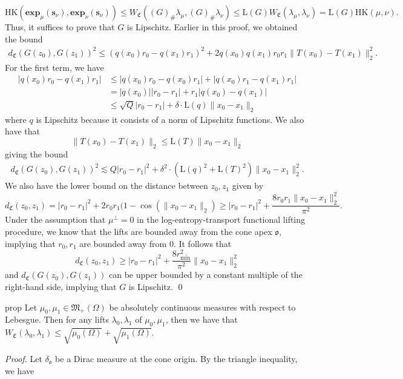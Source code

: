 \documentclass[11pt]{article}
\begin{document}
\[\text{HK}(\mathbf{exp}_\mu(\mathbf{s}_\nu), \mathbf{exp}_\nu(\mathbf{s}_\nu)) \leq W_\mathfrak{C}((G)_\# \lambda_{\mu}, (G)_\#\lambda_\nu) \leq \text{L}(G)W_\mathfrak{C}(\lambda_\mu, \lambda_\nu) = \text{L}(G)\text{HK}(\mu, \nu).\]
Thus, it suffices to prove that $G$ is Lipschitz. Earlier in this proof, we obtained the bound
\begin{align*}
    d_\mathfrak{C}(G(z_0), G(z_1))^2 \leq (q(x_0)r_0 - q(x_1)r_1)^2 + 2q(x_0)q(x_1)r_0r_1\|T(x_0) - T(x_1)\|_2^2.
\end{align*}
For the first term, we have
\begin{align*}
    |q(x_0)r_0 - q(x_1)r_1| &\leq |q(x_0)r_0 - q(x_0)r_1| + |q(x_0)r_1 - q(x_1)r_1| \\
    &= |q(x_0)||r_0 - r_1| + r_1|q(x_0) - q(x_1)| \\
    &\leq \sqrt{Q}|r_0 - r_1| + \delta\cdot \text{L}(q)\|x_0 - x_1\|_2
\end{align*}
where $q$ is Lipschitz because it consists of a norm of Lipschitz functions. We also have that 
\[\|T(x_0) - T(x_1)\|_2 \le \text{L}(T)\|x_0 - x_1\|_2\]
giving the bound
\begin{align*}
    d_\mathfrak{C}(G(z_0), G(z_1))^2 \lesssim Q|r_0 - r_1|^2 + \delta^2\cdot (\text{L}(q)^2 + \text{L}(T)^2)\|x_0 - x_1\|_2^2.
\end{align*}
We also have the lower bound on the distance between $z_0, z_1$ given by
\[d_\mathfrak{C}(z_0, z_1) = |r_0 - r_1|^2 + 2r_0r_1(1 - \cos(\|x_0 - x_1\|_2) \geq |r_0 - r_1|^2 + \frac{8r_0r_1\|x_0 - x_1\|_2^2}{\pi^2}.\]
Under the assumption that $\mu^\perp = 0$ in the log-entropy-transport functional lifting procedure, we know that the lifts are bounded away from the cone apex $\mathfrak{o},$ implying that $r_0, r_1$ are bounded away from 0. It follows that 
\[d_\mathfrak{C}(z_0, z_1)\geq |r_0 - r_1|^2 + \frac{8r_{\min}^2}{\pi^2}\|x_0 - x_1\|_2^2\]
and $d_\mathfrak{C}(G(z_0), G(z_1))$ can be upper bounded by a constant multiple of the right-hand side, implying that $G$ is Lipschitz. 
\qed{}
\\
\begin{restatable}{prop}{} \label{cone wasserstein upper bound}
    Let $\mu_0, \mu_1 \in \mathfrak{M}_+(\Omega)$ be absolutely continuous measures with respect to Lebesgue. Then for any lifts $\lambda_0, \lambda_1$ of $\mu_0, \mu_1$, then we have that $W_\mathfrak{C}(\lambda_0, \lambda_1) \leq \sqrt{\mu_0(\Omega)} + \sqrt{\mu_1(\Omega)}$.
\end{restatable}
\noindent \textit{Proof.} Let $\delta_\mathfrak{o}$ be a Dirac measure at the cone origin. By the triangle inequality, we have
\end{document}

